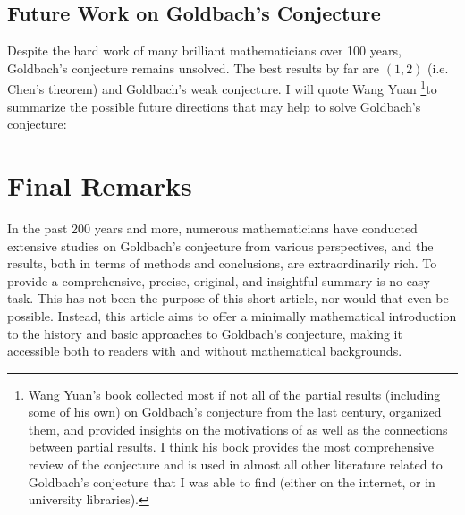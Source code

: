 \documentclass{article}
\begin{document}
\subsection*{Future Work on Goldbach's Conjecture}
Despite the hard work of many brilliant mathematicians over 100 years, Goldbach's conjecture remains unsolved. The best results by far are $(1,2)$ (i.e. Chen's theorem) and Goldbach's weak conjecture. I will quote Wang Yuan \footnote{Wang Yuan's book \cite{wang}collected most if not all of the partial results (including some of his own) on Goldbach's conjecture from the last century, organized them, and provided insights on the motivations of as well as the connections between partial results. I think his book provides the most comprehensive review of the conjecture and is used in almost all other literature related to Goldbach's conjecture that I was able to find (either on the internet, or in university libraries).}to summarize the possible future directions that may help to solve Goldbach's conjecture: \cite{wang}

\section*{Final Remarks}
In the past 200 years and more, numerous mathematicians have conducted extensive studies on Goldbach's conjecture from various perspectives, and the results, both in terms of methods and conclusions, are extraordinarily rich. To provide a comprehensive, precise, original, and insightful summary is no easy task. This has not been the purpose of this short article, nor would that even be possible. Instead, this article aims to offer a minimally mathematical introduction to the history and basic approaches to Goldbach's conjecture, making it accessible both to readers with and without mathematical backgrounds.
\end{document}
